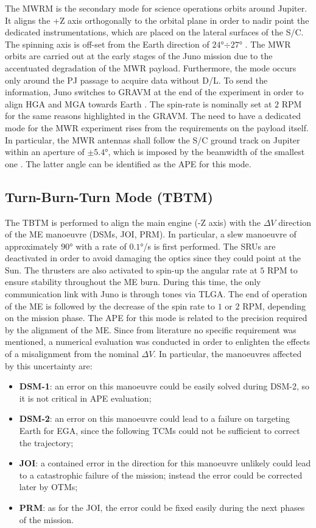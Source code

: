 The MWRM is the secondary mode for science operations orbits around Jupiter. It aligns the +Z axis orthogonally to the orbital plane in order to nadir point the dedicated instrumentations, which are placed on the lateral surfaces of the S/C. 
The spinning axis is off-set from the Earth direction of $24$°$\div$$27$° \cite{shadan}.
The MWR orbits are carried out at the early stages of the Juno mission due to the accentuated degradation of the MWR payload. Furthermore, the mode occurs only around the PJ passage to acquire data without D/L.
To send the information, Juno switches to GRAVM at the end of the experiment in order to align HGA and MGA towards Earth \cite{stuart}.
The spin-rate is nominally set at $2$ RPM for the same reasons highlighted in the GRAVM. 
The need to have a dedicated mode for the MWR experiment rises from the requirements on the payload itself.
In particular, the MWR antennas shall follow the S/C ground track on Jupiter within an aperture of $\pm 5.4$°, which is imposed by the beamwidth of the smallest one \cite{mwr}.
The latter angle can be identified as the APE for this mode.

\subsection{Turn-Burn-Turn Mode (TBTM)}
\label{subsec:tbt_mode}

The TBTM is performed to align the main engine (-Z axis) with the $\Delta V$ direction of the ME manoeuvre (DSMs, JOI, PRM).
In particular, a slew manoeuvre of approximately $90$° with a rate of $0.1$°/s is first performed. 
The SRUs are deactivated in order to avoid damaging the optics since they could point at the Sun.
The thrusters are also activated to spin-up the angular rate at $5$ RPM to ensure stability throughout the ME burn. During this time, the only communication link with Juno is through tones via TLGA.
The end of operation of the ME is followed by the decrease of the spin rate to $1$ or $2$ RPM, depending on the mission phase. The APE for this mode is related to the precision required by the alignment of the ME.
Since from literature no specific requirement was mentioned, a numerical evaluation was conducted in order to enlighten the effects of a misalignment from the nominal $\Delta V$.
In particular, the manoeuvres affected by this uncertainty are:
\begin{itemize}
    \item \textbf{DSM-1}: an error on this manoeuvre could be easily solved during DSM-2, so it is not critical in APE evaluation;
    \item \textbf{DSM-2}: an error on this manoeuvre could lead to a failure on targeting Earth for EGA, since the following TCMs could not be sufficient to correct the trajectory;
    \item \textbf{JOI}: a contained error in the direction for this manoeuvre unlikely could lead to a catastrophic failure of the mission; instead the error could be corrected later by OTMs;
    \item \textbf{PRM}: as for the JOI, the error could be fixed easily during the next phases of the mission.
\end{itemize}

